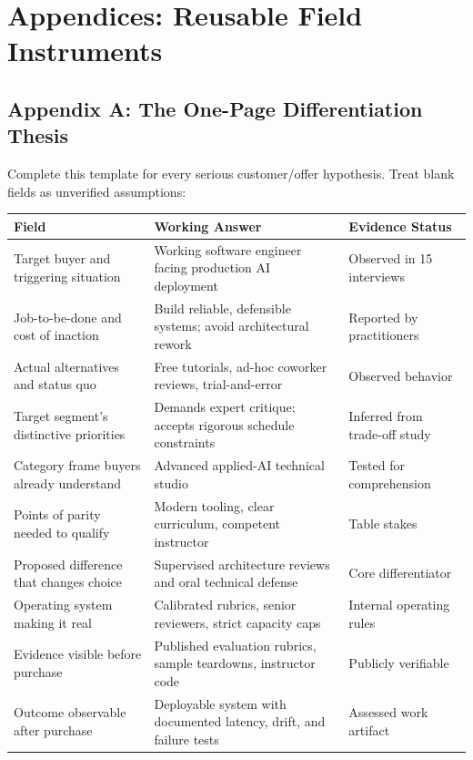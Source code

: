 \section*{Appendices: Reusable Field Instruments}

\subsection*{Appendix A: The One-Page Differentiation Thesis}

Complete this template for every serious customer/offer hypothesis. Treat blank fields as unverified assumptions:

\begin{table}[t]
\centering
\small
\begin{tabularx}{\textwidth}{>{\raggedright\arraybackslash}p{5.5cm} >{\raggedright\arraybackslash}X >{\raggedright\arraybackslash}p{4cm}}
\toprule
\textbf{Field} & \textbf{Working Answer} & \textbf{Evidence Status} \\
\midrule
Target buyer and triggering situation & Working software engineer facing production AI deployment & Observed in 15 interviews \\
Job-to-be-done and cost of inaction & Build reliable, defensible systems; avoid architectural rework & Reported by practitioners \\
Actual alternatives and status quo & Free tutorials, ad-hoc coworker reviews, trial-and-error & Observed behavior \\
Target segment's distinctive priorities & Demands expert critique; accepts rigorous schedule constraints & Inferred from trade-off study \\
Category frame buyers already understand & Advanced applied-AI technical studio & Tested for comprehension \\
Points of parity needed to qualify & Modern tooling, clear curriculum, competent instructor & Table stakes \\
Proposed difference that changes choice & Supervised architecture reviews and oral technical defense & Core differentiator \\
Operating system making it real & Calibrated rubrics, senior reviewers, strict capacity caps & Internal operating rules \\
Evidence visible before purchase & Published evaluation rubrics, sample teardowns, instructor code & Publicly verifiable \\
Outcome observable after purchase & Deployable system with documented latency, drift, and failure tests & Assessed work artifact \\

\end{tabularx}
\end{table}
